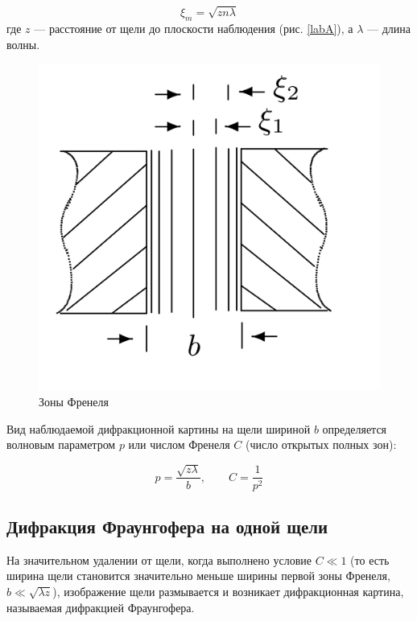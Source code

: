 \documentclass[a4paper,12pt]{article}
\begin{document}
\begin{equation}\label{xin}
\xi_m = \sqrt{zn\lambda}
\end{equation}
где $ z $ --- расстояние от щели до плоскости наблюдения (рис. \ref{labA}), а $ \lambda $ --- длина волны.

\begin{figure}[H]
	\begin{center}
		\includegraphics[scale=0.15]{zone.jpeg}
	\end{center}
	\caption{Зоны Френеля}
	\label{zone}
\end{figure}

Вид наблюдаемой дифракционной картины
на щели шириной $ b $ определяется волновым параметром $ p $ или числом Френеля $ C $ (число открытых полных зон):


\begin{equation}\label{p}
p = \dfrac{\sqrt{z \lambda}}{b}, \qquad C = \dfrac{1}{p^2}
\end{equation}




\subsection{Дифракция Фраунгофера на одной щели}

На значительном удалении от щели, когда выполнено условие $ C \ll 1 $
(то есть ширина щели становится значительно меньше ширины первой
зоны Френеля, $ b \ll \sqrt{\lambda z} $), изображение щели размывается и возникает
дифракционная картина, называемая дифракцией Фраунгофера.
\end{document}
